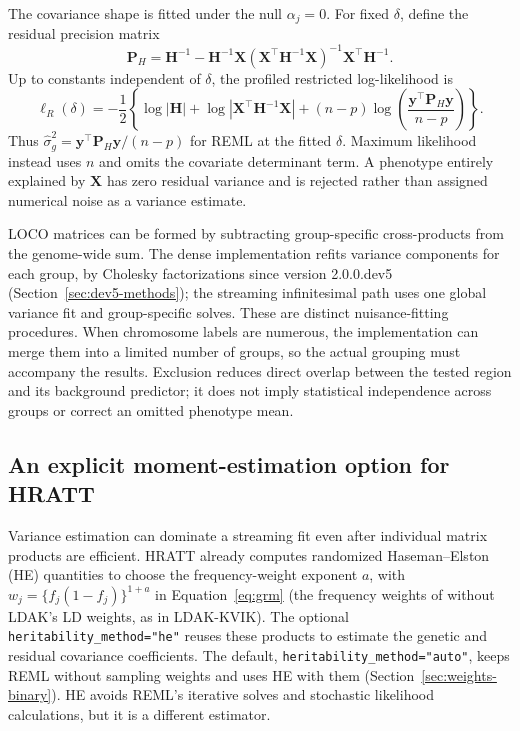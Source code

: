 \documentclass[11pt]{article}
\newcommand{\y}{\mathbf{y}}
\newcommand{\X}{\mathbf{X}}
\newcommand{\Hm}{\mathbf{H}}
\newcommand{\Pm}{\mathbf{P}}
\newcommand{\code}[1]{\texttt{#1}}
\begin{document}
The covariance shape is fitted under the null $\alpha_j=0$. For fixed
$\delta$, define the residual precision matrix
\begin{equation}
 \Pm_H=\Hm^{-1}-\Hm^{-1}\X
       (\X^\top\Hm^{-1}\X)^{-1}\X^\top\Hm^{-1}.
 \label{eq:projection}
\end{equation}
Up to constants independent of $\delta$, the profiled restricted
log-likelihood is
\begin{equation}
 \ell_R(\delta)=-\frac12\left\{
 \log|\Hm|+\log|\X^\top\Hm^{-1}\X|
 +(n-p)\log\left(\frac{\y^\top\Pm_H\y}{n-p}\right)\right\}.
 \label{eq:reml}
\end{equation}
Thus $\widehat\sigma_g^2=\y^\top\Pm_H\y/(n-p)$ for REML at the fitted
$\delta$. Maximum likelihood instead uses $n$ and omits the covariate
determinant term. A phenotype entirely explained by $\X$ has zero
residual variance and is rejected rather than assigned numerical noise
as a variance estimate.

LOCO matrices can be formed by subtracting group-specific cross-products
from the genome-wide sum. The dense implementation refits variance
components for each group, by Cholesky factorizations since version
2.0.0.dev5 (Section~\ref{sec:dev5-methods}); the streaming infinitesimal path uses one
global variance fit and group-specific solves. These are distinct
nuisance-fitting procedures. When chromosome labels are numerous, the
implementation can merge them into a limited number of groups, so the
actual grouping must accompany the results. Exclusion reduces direct
overlap between the tested region and its background predictor; it does
not imply statistical independence across groups or correct an omitted
phenotype mean.

\subsection{An explicit moment-estimation option for HRATT}
\label{sec:he-method}

Variance estimation can dominate a streaming fit even after individual
matrix products are efficient. HRATT already computes randomized
Haseman--Elston (HE) quantities \citep{haseman1972,wu2018} to choose the frequency-weight exponent
$a$, with $w_j=\{f_j(1-f_j)\}^{1+a}$ in Equation~\eqref{eq:grm}
(the frequency weights of \citealp{speed2017} without LDAK's LD weights, as in LDAK-KVIK).
The optional \code{heritability\_method="he"} reuses these products to
estimate the genetic and residual covariance coefficients. The default,
\code{heritability\_method="auto"}, keeps REML without sampling weights and
uses HE with them (Section~\ref{sec:weights-binary}). HE avoids REML's
iterative solves and stochastic likelihood calculations, but it is a
different estimator.
\end{document}
